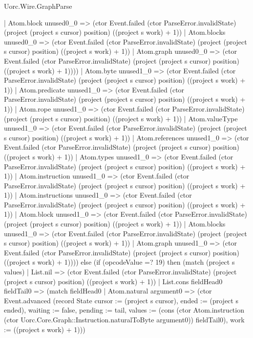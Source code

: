 \begin{lexlean}{Uorc.Wire.GraphParse}
\begin{semanticmodule}
{              | Atom.block unused0_0 => (ctor Event.failed (ctor ParseError.invalidState) (project (project s cursor) position) ((project s work) + 1))
              | Atom.blocks unused0_0 => (ctor Event.failed (ctor ParseError.invalidState) (project (project s cursor) position) ((project s work) + 1))
              | Atom.graph unused0_0 => (ctor Event.failed (ctor ParseError.invalidState) (project (project s cursor) position) ((project s work) + 1))))
          | Atom.byte unused1_0 => (ctor Event.failed (ctor ParseError.invalidState) (project (project s cursor) position) ((project s work) + 1))
          | Atom.predicate unused1_0 => (ctor Event.failed (ctor ParseError.invalidState) (project (project s cursor) position) ((project s work) + 1))
          | Atom.rope unused1_0 => (ctor Event.failed (ctor ParseError.invalidState) (project (project s cursor) position) ((project s work) + 1))
          | Atom.valueType unused1_0 => (ctor Event.failed (ctor ParseError.invalidState) (project (project s cursor) position) ((project s work) + 1))
          | Atom.references unused1_0 => (ctor Event.failed (ctor ParseError.invalidState) (project (project s cursor) position) ((project s work) + 1))
          | Atom.types unused1_0 => (ctor Event.failed (ctor ParseError.invalidState) (project (project s cursor) position) ((project s work) + 1))
          | Atom.instruction unused1_0 => (ctor Event.failed (ctor ParseError.invalidState) (project (project s cursor) position) ((project s work) + 1))
          | Atom.instructions unused1_0 => (ctor Event.failed (ctor ParseError.invalidState) (project (project s cursor) position) ((project s work) + 1))
          | Atom.block unused1_0 => (ctor Event.failed (ctor ParseError.invalidState) (project (project s cursor) position) ((project s work) + 1))
          | Atom.blocks unused1_0 => (ctor Event.failed (ctor ParseError.invalidState) (project (project s cursor) position) ((project s work) + 1))
          | Atom.graph unused1_0 => (ctor Event.failed (ctor ParseError.invalidState) (project (project s cursor) position) ((project s work) + 1)))) else (if (opcodeValue =? 19) then (match (project s values)
        | List.nil => (ctor Event.failed (ctor ParseError.invalidState) (project (project s cursor) position) ((project s work) + 1))
        | List.cons fieldHead0 fieldTail0 => (match fieldHead0
          | Atom.natural argument0 => (ctor Event.advanced (record State {cursor := (project s cursor), ended := (project s ended), waiting := false, pending := tail, values := (cons (ctor Atom.instruction (ctor Uorc.Core.Graph::Instruction.naturalToByte argument0)) fieldTail0), work := ((project s work) + 1)}))
}
\end{semanticmodule}
\end{lexlean}
